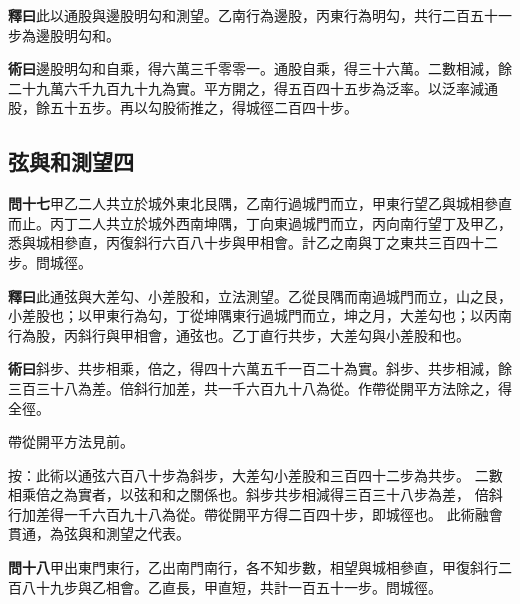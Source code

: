 \documentclass[12pt,a4paper]{article}
\newcommand{\Section}[1]{\subsection*{#1}}
\begin{document}
\vspace{0.3em}

\noindent\textbf{釋曰}\quad 此以通股與邊股明勾和測望。乙南行為邊股，丙東行為明勾，共行二百五十一步為邊股明勾和。

\vspace{0.3em}

\noindent\textbf{術曰}\quad 邊股明勾和自乘，得六萬三千零零一。通股自乘，得三十六萬。二數相減，餘二十九萬六千九百九十九為實。平方開之，得五百四十五步為泛率。以泛率減通股，餘五十五步。再以勾股術推之，得城徑二百四十步。

\Section{弦與和測望四}

\noindent\textbf{問十七}\quad 甲乙二人共立於城外東北艮隅，乙南行過城門而立，甲東行望乙與城相參直而止。丙丁二人共立於城外西南坤隅，丁向東過城門而立，丙向南行望丁及甲乙，悉與城相參直，丙復斜行六百八十步與甲相會。計乙之南與丁之東共三百四十二步。問城徑。

\vspace{0.3em}

\noindent\textbf{釋曰}\quad 此通弦與大差勾、小差股和，立法測望。乙從艮隅而南過城門而立，山之艮，小差股也；以甲東行為勾，丁從坤隅東行過城門而立，坤之月，大差勾也；以丙南行為股，丙斜行與甲相會，通弦也。乙丁直行共步，大差勾與小差股和也。

\vspace{0.3em}

\noindent\textbf{術曰}\quad 斜步、共步相乘，倍之，得四十六萬五千一百二十為實。斜步、共步相減，餘三百三十八為差。倍斜行加差，共一千六百九十八為從。作帶從開平方法除之，得全徑。

\vspace{0.3em}

帶從開平方法見前。

\vspace{0.3em}

\noindent
按：此術以通弦六百八十步為斜步，大差勾小差股和三百四十二步為共步。
二數相乘倍之為實者，以弦和和之關係也。斜步共步相減得三百三十八步為差，
倍斜行加差得一千六百九十八為從。帶從開平方得二百四十步，即城徑也。
此術融會貫通，為弦與和測望之代表。

\vspace{0.5em}

\noindent\textbf{問十八}\quad 甲出東門東行，乙出南門南行，各不知步數，相望與城相參直，甲復斜行二百八十九步與乙相會。乙直長，甲直短，共計一百五十一步。問城徑。
\end{document}
